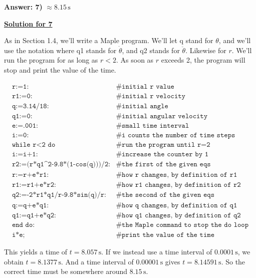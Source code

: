 \textbf{Answer: 7)} $\approx 8.15 \,\text{s}$

\underline{\textbf{Solution for 7}}

As in Section 1.4, we'll write a Maple program. We'll let q stand for $\theta$, and we'll use the notation where q1 stands for $\dot{\theta}$, and q2 stands for $\ddot{\theta}$. Likewise for $r$. We'll run the program for as long as $r < 2$. As soon as $r$ exceeds 2, the program will stop and print the value of the time.



$$
\begin{array}{ll}
\texttt{r:=1:} & \texttt{\# initial r value} \\
\texttt{r1:=0:} & \texttt{\# initial r velocity} \\
\texttt{q:=3.14/18:} & \texttt{\# initial angle} \\
\texttt{q1:=0:} & \texttt{\# initial angular velocity} \\
\texttt{e:=.001:} & \texttt{\# small time interval} \\
\texttt{i:=0:} & \texttt{\# i counts the number of time steps} \\
\texttt{while r<2 do} & \texttt{\# run the program until r=2} \\
\texttt{i:=i+1:} & \texttt{\# increase the counter by 1} \\
\texttt{r2:=(r*q1\textasciicircum{}2-9.8*(1-cos(q)))/2:} & \texttt{\# the first of the given eqs} \\
\texttt{r:=r+e*r1:} & \texttt{\# how r changes, by definition of r1} \\
\texttt{r1:=r1+e*r2:} & \texttt{\# how r1 changes, by definition of r2} \\
\texttt{q2:=-2*r1*q1/r-9.8*sin(q)/r:} & \texttt{\# the second of the given eqs} \\
\texttt{q:=q+e*q1:} & \texttt{\# how q changes, by definition of q1} \\
\texttt{q1:=q1+e*q2:} & \texttt{\# how q1 changes, by definition of q2} \\
\texttt{end do:} & \texttt{\# the Maple command to stop the do loop} \\
\texttt{i*e;} & \texttt{\# print the value of the time}
\end{array}
$$



This yields a time of $t = 8.057 \,\text{s}$. If we instead use a time interval of $0.0001 \,\text{s}$, we obtain $t = 8.1377 \,\text{s}$. And a time interval of $0.00001 \,\text{s}$ gives $t = 8.14591 \,\text{s}$. So the correct time must be somewhere around $8.15 \,\text{s}$.